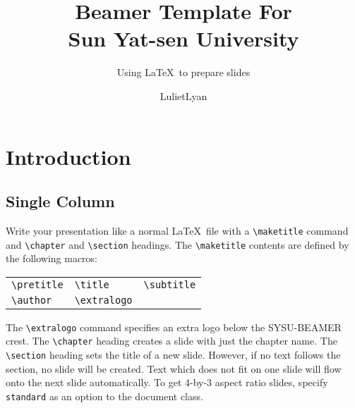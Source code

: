 \documentclass{sysubeamer}
\title{Beamer Template For \\ Sun Yat-sen University}
\subtitle{Using \LaTeX\ to prepare slides}
\author{LulietLyan}
\begin{document}
\maketitle

\chapter{Introduction}

\section{Single Column}

Write your presentation like a normal \LaTeX\ file with a \verb|\maketitle|
command and \verb|\chapter| and \verb|\section| headings. The \verb|\maketitle|
contents are defined by the following macros:
\begin{center}
    \begin{tabular}{l@{\qquad}l@{\qquad}l}
        \verb|\pretitle| &
        \verb|\title| &
        \verb|\subtitle| \\
        \verb|\author| &
        \verb|\extralogo|
    \end{tabular}
\end{center}
The \verb|\extralogo| command specifies an extra logo below the SYSU-BEAMER crest. The
\verb|\chapter| heading creates a slide with just the chapter name. The
\verb|\section| heading sets the title of a new slide. However, if no text
follows the section, no slide will be created. Text which does not fit on one
slide will flow onto the next slide automatically. To get 4-by-3 aspect ratio
slides, specify \verb|standard| as an option to the document class.
\end{document}
